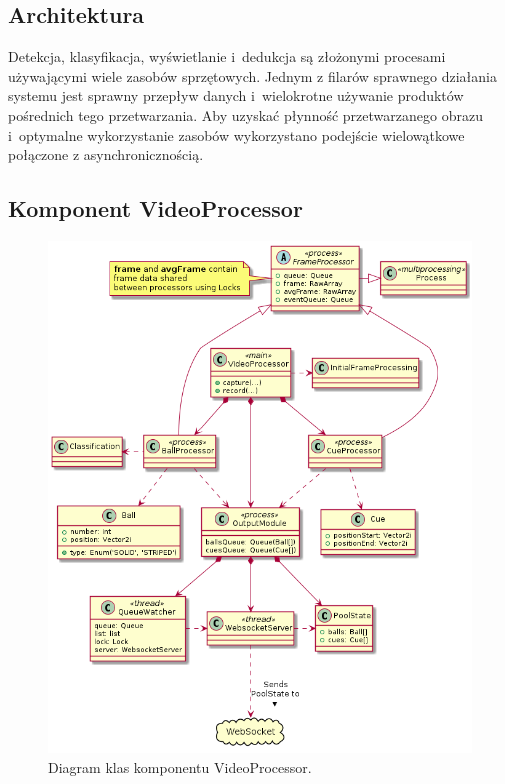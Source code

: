 \documentclass[12pt]{article}
\begin{document}
\subsection{Architektura}

Detekcja, klasyfikacja, wyświetlanie i~dedukcja są złożonymi procesami używającymi wiele zasobów sprzętowych. Jednym z filarów sprawnego działania systemu jest sprawny przepływ danych i~wielokrotne używanie produktów pośrednich tego przetwarzania. Aby uzyskać płynność przetwarzanego obrazu i~optymalne wykorzystanie zasobów wykorzystano podejście wielowątkowe połączone z asynchronicznością.

\subsection{Komponent VideoProcessor}

\begin{figure}[!htb]
    \centering
    \includegraphics[width=14cm]{./diagrams/out/video_processor_cd.png}
    \caption{Diagram klas komponentu VideoProcessor.}
    \label{vp_cd}
\end{figure}
\end{document}
